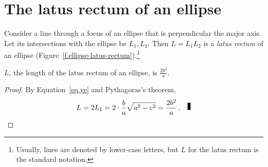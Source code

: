 %
%
%
%
%
%


\section{The latus rectum of an ellipse}

\begin{definition}\label{def.ellipse-lr}
Consider a line through a focus of an ellipse that is perpendicular the major axis. Let its intersections with the ellipse be $L_1,L_2$. Then $L=L_1L_2$ is a \emph{latus rectum} of an ellipse (Figure~\ref{f.ellipse-latus-rectum}).\footnote{Usually, lines are denoted by lower-case letters, but $L$ for the latus rectum is the standard notation.}
\end{definition}
\begin{theorem}\label{thm.ellipse-lr}
$L$, the length of the latus rectum of an ellipse, is 
$\displaystyle\frac{2b^2}{a}$.
\end{theorem}
\begin{proof}
By Equation~\ref{eq.ye} and Pythagoras's theorem,
\[
L=2L_1=2\cdot\frac{b}{a}\sqrt{a^2-c^2}=\displaystyle\frac{2b^2}{a}\,.\fqed
\]
\end{proof}

